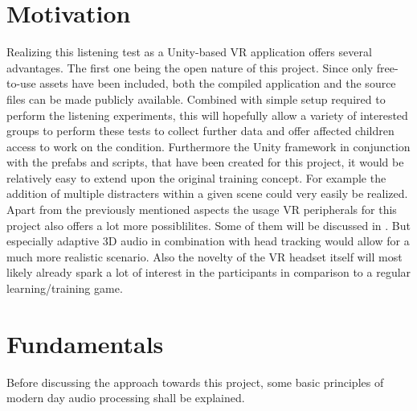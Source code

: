 \documentclass[a4paper,11pt]{article}%
\renewcommand{\\}{\vspace*{0.5\baselineskip} \newline}
\begin{document}
\section{Motivation}
\label{sec:motivation}
Realizing this listening test as a Unity-based VR application offers several advantages. The first one being the open nature of this project. Since only free-to-use assets have been included, both the compiled application and the source files can be made publicly available. Combined with simple setup required to perform the listening experiments, this will hopefully allow a variety of interested groups to perform these tests to collect further data and offer affected children access to work on the condition.
\newline
\newline
Furthermore the Unity framework in conjunction with the prefabs and scripts, that have been created for this project, it would be relatively easy to extend upon the original training concept. For example the addition of multiple distracters within a given scene could very easily be realized.
\newline
\newline
Apart from the previously mentioned aspects the usage VR peripherals for this project also offers a lot more possiblilites. Some of them will be discussed in . But especially adaptive 3D audio in combination with head tracking would allow for a much more realistic scenario. Also the novelty of the VR headset itself will most likely already spark a lot of interest in the participants in comparison to a regular learning/training game.
 

\section{Fundamentals}
\label{sec:fundamentals}
Before discussing the approach towards this project, some basic principles of modern day audio processing shall be explained.

\end{document}
